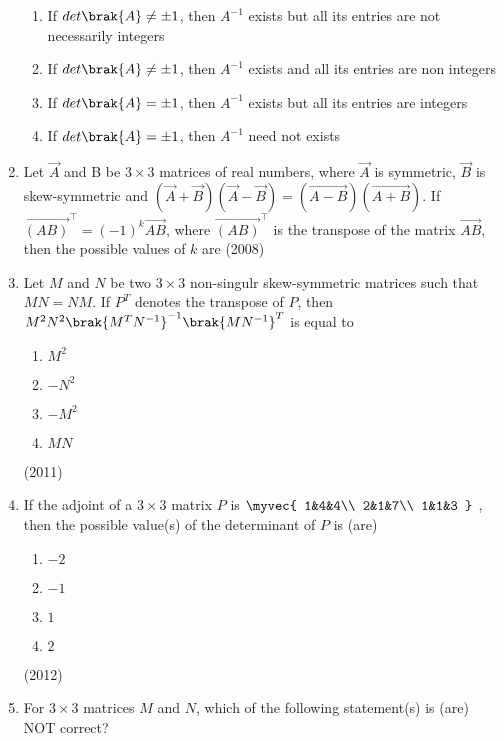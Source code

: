 \begin{enumerate}
\begin{enumerate}
			\item If $det\brak{A}\neq\pm1$, then $A^{-1}$ exists but all its entries are not necessarily integers
			\item If $det\brak{A}\neq\pm1$, then $A^{-1}$ exists and all its entries are non integers
			\item If $det\brak{A}=\pm1$, then $A^{-1}$ exists but all its entries are integers
			\item If $det\brak{A}=\pm1$, then $A^{-1}$ need not exists
		\end{enumerate}
		\item 
			Let $\vec{A}$ and B be $3\times3$ matrices of real numbers, where $\vec{A}$ is symmetric, $\vec{B}$ is skew-symmetric and $(\vec{A}+\vec{B})(\vec{A}-\vec{B})=(\vec{A-B})(\vec{A+B})$. If $\vec{(AB)}^\top=(-1)^k\vec{AB}$, where $\vec{(AB)}^\top$ is the transpose of the matrix $\vec{AB}$, then the possible values of $k$ are 
		\hfill(2008)
    \item 
        Let $M$ and $N$ be two $3 \times 3$ non-singulr skew-symmetric matrices such that $MN=NM$. If $P^T$ denotes the transpose of $P$, then $M^2N^2\brak{M^TN^{-1}}^{-1} \brak{MN^{-1}}^T$ is equal to 
        \begin{enumerate}
            \item $M^2$
            \item $-N^2$
            \item $-M^2$
            \item $MN$
        \end{enumerate}
        \hfill (2011)
    \item 
        If the adjoint of a $3 \times 3$ matrix $P$ is 
                $\myvec{	
                    1&4&4\\
                    2&1&7\\
                    1&1&3
                }$
        , then the possible value(s) of the determinant of $P$ is (are)
            \begin{enumerate}
                \item $-2$
                \item $-1$
                \item $1$
                \item $2$
            \end{enumerate}
            \hfill (2012)
    \item 
        For $3 \times 3$ matrices $M$ and $N$, which of the following statement(s) is (are) NOT correct?
            \begin{enumerate}

\end{enumerate}
\end{enumerate}
